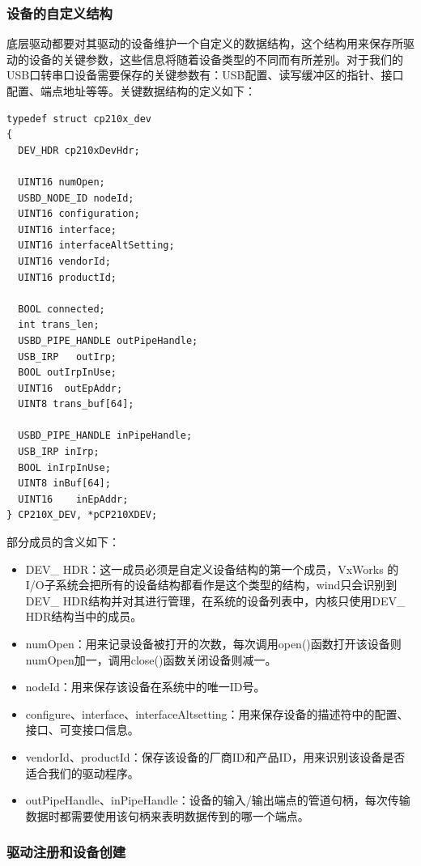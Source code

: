 \subsubsection{设备的自定义结构}
	底层驱动都要对其驱动的设备维护一个自定义的数据结构，这个结构用来保存所驱动的设备的关键参数，这些信息将随着设备类型的不同而有所差别。对于我们的USB口转串口设备需要保存的关键参数有：USB配置、读写缓冲区的指针、接口配置、端点地址等等。关键数据结构的定义如下： 
	
\lstset{language=C}
\begin{lstlisting}
typedef struct cp210x_dev
{
  DEV_HDR cp210xDevHdr; 
  
  UINT16 numOpen;
  USBD_NODE_ID nodeId;
  UINT16 configuration;	
  UINT16 interface; 
  UINT16 interfaceAltSetting;
  UINT16 vendorId;
  UINT16 productId;

  BOOL connected;  
  int trans_len;
  USBD_PIPE_HANDLE outPipeHandle; 
  USB_IRP	outIrp; 
  BOOL outIrpInUse; 
  UINT16  outEpAddr;
  UINT8 trans_buf[64];

  USBD_PIPE_HANDLE inPipeHandle;
  USB_IRP inIrp;
  BOOL inIrpInUse;
  UINT8 inBuf[64];
  UINT16 	inEpAddr;
} CP210X_DEV, *pCP210XDEV;
\end{lstlisting}
\noindent 部分成员的含义如下：

\begin{itemize}
\item DEV\_ HDR：这一成员必须是自定义设备结构的第一个成员，VxWorks 的I/O子系统会把所有的设备结构都看作是这个类型的结构，wind只会识别到DEV\_ HDR结构并对其进行管理，在系统的设备列表中，内核只使用DEV\_ HDR结构当中的成员。
\item numOpen：用来记录设备被打开的次数，每次调用open()函数打开该设备则numOpen加一，调用close()函数关闭设备则减一。
\item nodeId：用来保存该设备在系统中的唯一ID号。
\item configure、interface、interfaceAltsetting：用来保存设备的描述符中的配置、接口、可变接口信息。
\item vendorId、productId：保存该设备的厂商ID和产品ID，用来识别该设备是否适合我们的驱动程序。
\item outPipeHandle、inPipeHandle：设备的输入/输出端点的管道句柄，每次传输数据时都需要使用该句柄来表明数据传到的哪一个端点。
\end{itemize}






\subsubsection{驱动注册和设备创建} 
	
